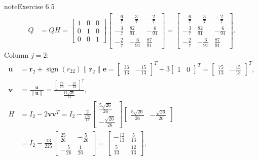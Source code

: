 \documentclass[letterpaper,10pt,english]{jupyterBook}
\begin{document}
\begin{sphinxadmonition}{note}{Exercise 6.5}
\begin{align*}
    Q &= Q H = \left[\begin{matrix}1 & 0 & 0\\0 & 1 & 0\\0 & 0 & 1\end{matrix}\right]\left[\begin{matrix}- \frac{6}{7} & - \frac{3}{7} & - \frac{2}{7}\\- \frac{3}{7} & \frac{82}{91} & - \frac{6}{91}\\- \frac{2}{7} & - \frac{6}{91} & \frac{87}{91}\end{matrix}\right] = \left[\begin{matrix}- \frac{6}{7} & - \frac{3}{7} & - \frac{2}{7}\\- \frac{3}{7} & \frac{82}{91} & - \frac{6}{91}\\- \frac{2}{7} & - \frac{6}{91} & \frac{87}{91}\end{matrix}\right].
\end{align*}
\sphinxAtStartPar
Column \(j = 2\):
\begin{align*}
    \mathbf{u} &= \mathbf{r}_{2} + \operatorname{sign}(r_{22}) \| \mathbf{r}_{2} \| \mathbf{e} = \left[\begin{matrix}\frac{36}{13} & - \frac{15}{13}\end{matrix}\right]^T + 3 \left[\begin{matrix}1 & 0\end{matrix}\right]^T = \left[\begin{matrix}\frac{75}{13} & - \frac{15}{13}\end{matrix}\right]^T, \\
    \mathbf{v} &= \frac{\mathbf{u}}{\| \mathbf{u} \|} = \frac{\left[\begin{matrix}\frac{75}{13} & - \frac{15}{13}\end{matrix}\right]^T}{\frac{15 \sqrt{26}}{13}}, \\
    H &= I_2 - 2\mathbf{vv}^T = I_2 - \frac{2}{\frac{450}{13}}\left[\begin{matrix}\frac{5 \sqrt{26}}{26}\\- \frac{\sqrt{26}}{26}\end{matrix}\right]\left[\begin{matrix}\frac{5 \sqrt{26}}{26} & - \frac{\sqrt{26}}{26}\end{matrix}\right] \\
      &= I_2 - \frac{13}{225}\left[\begin{matrix}\frac{25}{26} & - \frac{5}{26}\\- \frac{5}{26} & \frac{1}{26}\end{matrix}\right] = \left[\begin{matrix}- \frac{12}{13} & \frac{5}{13}\\\frac{5}{13} & \frac{12}{13}\end{matrix}\right],

\end{align*}
\end{sphinxadmonition}
\end{document}
